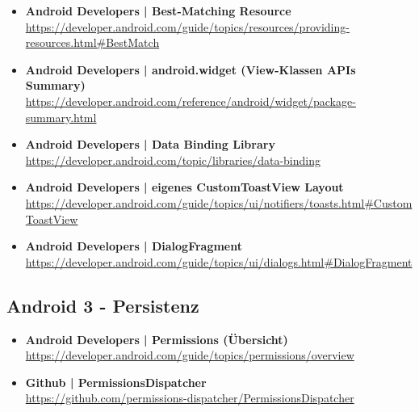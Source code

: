 \documentclass[a4paper]{article}
\begin{document}
{\begin{itemize}
		\item \textbf{Android Developers | Best-Matching Resource}\\
		\href{https://developer.android.com/guide/topics/resources/providing-resources.html#BestMatch}
		{https://developer.android.com/guide/topics/resources/providing-resources.html\#BestMatch}
		
		\item \textbf{Android Developers | android.widget (View-Klassen APIs Summary)}\\
		\href{https://developer.android.com/reference/android/widget/package-summary.html}
		{https://developer.android.com/reference/android/widget/package-summary.html}
		
		\item \textbf{Android Developers | Data Binding Library}\\
		\href{https://developer.android.com/topic/libraries/data-binding}
		{https://developer.android.com/topic/libraries/data-binding}
		
		\item \textbf{Android Developers | eigenes CustomToastView Layout}\\
		\href{https://developer.android.com/guide/topics/ui/notifiers/toasts.html#CustomToastView}
		{https://developer.android.com/guide/topics/ui/notifiers/toasts.html\#CustomToastView}
		
		\item \textbf{Android Developers | DialogFragment}\\
		\href{https://developer.android.com/guide/topics/ui/dialogs.html#DialogFragment}
		{https://developer.android.com/guide/topics/ui/dialogs.html\#DialogFragment}
		
		
	\end{itemize}
	
	\subsection{Android 3 - Persistenz}
	
	\begin{itemize}
		\item \textbf{Android Developers | Permissions (Übersicht)}\\
		\href{https://developer.android.com/guide/topics/permissions/overview}
		{https://developer.android.com/guide/topics/permissions/overview}
		
		\item \textbf{Github | PermissionsDispatcher}\\
		\href{https://github.com/permissions-dispatcher/PermissionsDispatcher}
		{https://github.com/permissions-dispatcher/PermissionsDispatcher}
		

\end{itemize}}
\end{document}
